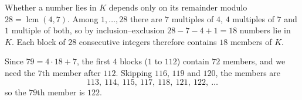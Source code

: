 Whether a number lies in $K$ depends only on its remainder modulo $28=\operatorname{lcm}(4,7)$. Among $1,\dots,28$ there are $7$ multiples of $4$, $4$ multiples of $7$ and $1$ multiple of both, so by inclusion--exclusion $28-7-4+1=18$ numbers lie in $K$. Each block of $28$ consecutive integers therefore contains $18$ members of $K$.

Since $79=4\cdot18+7$, the first $4$ blocks ($1$ to $112$) contain $72$ members, and we need the $7$th member after $112$. Skipping $116$, $119$ and $120$, the members are
\[
113,\ 114,\ 115,\ 117,\ 118,\ 121,\ 122,\ \dots
\]
so the $79$th member is $\boxed{122}$.
